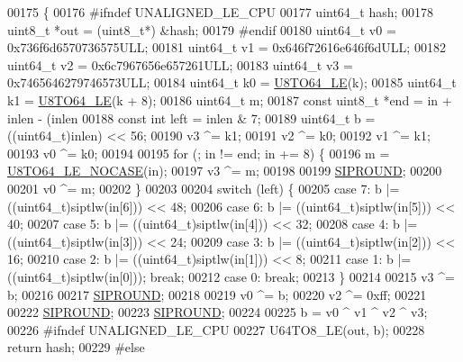 \begin{DoxyCode}
{00175 \{
00176 \textcolor{preprocessor}{#}\textcolor{preprocessor}{ifndef} UNALIGNED\_LE\_CPU
00177     uint64\_t hash;
00178     uint8\_t *out = (uint8\_t*) &hash;
00179 \textcolor{preprocessor}{#}\textcolor{preprocessor}{endif}
00180     uint64\_t v0 = 0x736f6d6570736575ULL;
00181     uint64\_t v1 = 0x646f72616e646f6dULL;
00182     uint64\_t v2 = 0x6c7967656e657261ULL;
00183     uint64\_t v3 = 0x7465646279746573ULL;
00184     uint64\_t k0 = \hyperlink{siphash_8c_a1de2481f51a86cbfa0b7d0cdd4d68a69}{U8TO64\_LE}(k);
00185     uint64\_t k1 = \hyperlink{siphash_8c_a1de2481f51a86cbfa0b7d0cdd4d68a69}{U8TO64\_LE}(k + 8);
00186     uint64\_t m;
00187     \textcolor{keyword}{const} uint8\_t *end = in + inlen - (inlen %
00188     \textcolor{keyword}{const} \textcolor{keywordtype}{int} left = inlen & 7;
00189     uint64\_t b = ((uint64\_t)inlen) << 56;
00190     v3 ^= k1;
00191     v2 ^= k0;
00192     v1 ^= k1;
00193     v0 ^= k0;
00194 
00195     \textcolor{keywordflow}{for} (; in != end; in += 8) \{
00196         m = \hyperlink{siphash_8c_a8682efbe353b9e5b9a5c014e5a3809ec}{U8TO64\_LE\_NOCASE}(in);
00197         v3 ^= m;
00198 
00199         \hyperlink{siphash_8c_abd545ba6d36990ee5903ff4d0e6edecf}{SIPROUND};
00200 
00201         v0 ^= m;
00202     \}
00203 
00204     \textcolor{keywordflow}{switch} (left) \{
00205     \textcolor{keywordflow}{case} 7: b |= ((uint64\_t)siptlw(in[6])) << 48;
00206     \textcolor{keywordflow}{case} 6: b |= ((uint64\_t)siptlw(in[5])) << 40;
00207     \textcolor{keywordflow}{case} 5: b |= ((uint64\_t)siptlw(in[4])) << 32;
00208     \textcolor{keywordflow}{case} 4: b |= ((uint64\_t)siptlw(in[3])) << 24;
00209     \textcolor{keywordflow}{case} 3: b |= ((uint64\_t)siptlw(in[2])) << 16;
00210     \textcolor{keywordflow}{case} 2: b |= ((uint64\_t)siptlw(in[1])) << 8;
00211     \textcolor{keywordflow}{case} 1: b |= ((uint64\_t)siptlw(in[0])); \textcolor{keywordflow}{break};
00212     \textcolor{keywordflow}{case} 0: \textcolor{keywordflow}{break};
00213     \}
00214 
00215     v3 ^= b;
00216 
00217     \hyperlink{siphash_8c_abd545ba6d36990ee5903ff4d0e6edecf}{SIPROUND};
00218 
00219     v0 ^= b;
00220     v2 ^= 0xff;
00221 
00222     \hyperlink{siphash_8c_abd545ba6d36990ee5903ff4d0e6edecf}{SIPROUND};
00223     \hyperlink{siphash_8c_abd545ba6d36990ee5903ff4d0e6edecf}{SIPROUND};
00224 
00225     b = v0 ^ v1 ^ v2 ^ v3;
00226 \textcolor{preprocessor}{#}\textcolor{preprocessor}{ifndef} UNALIGNED\_LE\_CPU
00227     U64TO8\_LE(out, b);
00228     \textcolor{keywordflow}{return} hash;
00229 \textcolor{preprocessor}{#}\textcolor{preprocessor}{else}
}
\end{DoxyCode}
